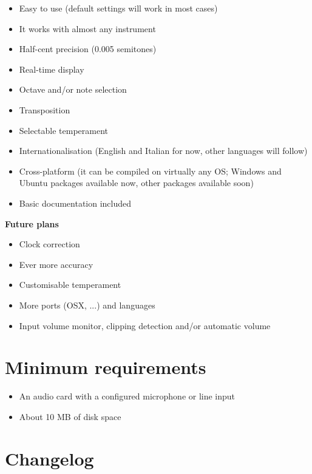 \begin{itemize}
	\item Easy to use (default settings will work in most cases)
	\item It works with almost any instrument
	\item Half-cent precision (0.005 semitones)
	\item Real-time display
	\item Octave and/or note selection
	\item Transposition
	\item Selectable temperament
	\item Internationalisation (English and Italian for now, other languages will follow)
	\item Cross-platform (it can be compiled on virtually any OS;
		Windows and Ubuntu packages available now,  other packages available soon)
	\item Basic documentation included
\end{itemize}

\textbf{Future plans}
\begin{itemize}
	\item Clock correction
	\item Ever more accuracy
	\item Customisable temperament
	\item More ports (OSX, ...) and languages
	\item Input volume monitor, clipping detection and/or automatic volume
\end{itemize}

\section{Minimum requirements}\label{requirements}

\begin{itemize}
\item An audio card with a configured microphone or line input
\item About 10 MB of disk space
\end{itemize}

\section{Changelog}\label{changelog}

